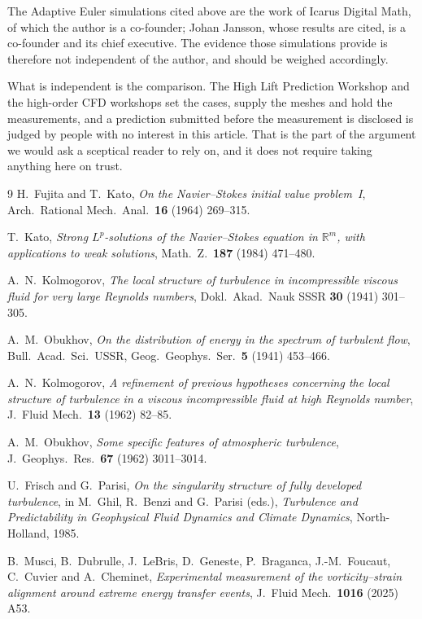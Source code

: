 \documentclass[11pt]{article}
\begin{document}
The Adaptive Euler simulations cited above are the work of Icarus Digital Math, of which the author
is a co-founder; Johan Jansson, whose results are cited, is a co-founder and its chief executive. The
evidence those simulations provide is therefore not independent of the author, and should be weighed
accordingly.

What is independent is the comparison. The High Lift Prediction Workshop and the high-order CFD
workshops set the cases, supply the meshes and hold the measurements, and a prediction submitted
before the measurement is disclosed is judged by people with no interest in this article. That is the
part of the argument we would ask a sceptical reader to rely on, and it does not require taking
anything here on trust.

\begin{thebibliography}{9}
 H.~Fujita and T.~Kato, \emph{On the Navier--Stokes initial value problem~I},
Arch.\ Rational Mech.\ Anal.\ \textbf{16} (1964) 269--315.

 T.~Kato, \emph{Strong $L^p$-solutions of the Navier--Stokes equation in
$\mathbb{R}^m$, with applications to weak solutions}, Math.\ Z.\ \textbf{187} (1984) 471--480.

 A.~N.~Kolmogorov, \emph{The local structure of turbulence in incompressible
viscous fluid for very large Reynolds numbers}, Dokl.\ Akad.\ Nauk SSSR \textbf{30} (1941) 301--305.

 A.~M.~Obukhov, \emph{On the distribution of energy in the spectrum of turbulent
flow}, Bull.\ Acad.\ Sci.\ USSR, Geog.\ Geophys.\ Ser.\ \textbf{5} (1941) 453--466.

 A.~N.~Kolmogorov, \emph{A refinement of previous hypotheses concerning the
local structure of turbulence in a viscous incompressible fluid at high Reynolds number}, J.\ Fluid
Mech.\ \textbf{13} (1962) 82--85.

 A.~M.~Obukhov, \emph{Some specific features of atmospheric turbulence}, J.\
Geophys.\ Res.\ \textbf{67} (1962) 3011--3014.

 U.~Frisch and G.~Parisi, \emph{On the singularity structure of fully developed
turbulence}, in M.~Ghil, R.~Benzi and G.~Parisi (eds.), \emph{Turbulence and Predictability in
Geophysical Fluid Dynamics and Climate Dynamics}, North-Holland, 1985.

 B.~Musci, B.~Dubrulle, J.~LeBris, D.~Geneste, P.~Braganca, J.-M.~Foucaut, C.~Cuvier
and A.~Cheminet, \emph{Experimental measurement of the vorticity--strain alignment around extreme
energy transfer events}, J.\ Fluid Mech.\ \textbf{1016} (2025) A53.


\end{thebibliography}
\end{document}
